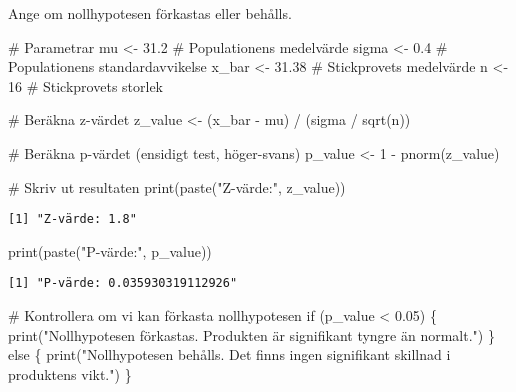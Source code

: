 \documentclass[
  letterpaper,
  DIV=11,
  numbers=noendperiod]{scrartcl}
\newenvironment{Shaded}{\begin{snugshade}}{\end{snugshade}}
\newcommand{\CommentTok}[1]{\textcolor[rgb]{0.37,0.37,0.37}{#1}}
\newcommand{\ControlFlowTok}[1]{\textcolor[rgb]{0.00,0.23,0.31}{#1}}
\newcommand{\DecValTok}[1]{\textcolor[rgb]{0.68,0.00,0.00}{#1}}
\newcommand{\FloatTok}[1]{\textcolor[rgb]{0.68,0.00,0.00}{#1}}
\newcommand{\FunctionTok}[1]{\textcolor[rgb]{0.28,0.35,0.67}{#1}}
\newcommand{\NormalTok}[1]{\textcolor[rgb]{0.00,0.23,0.31}{#1}}
\newcommand{\OtherTok}[1]{\textcolor[rgb]{0.00,0.23,0.31}{#1}}
\newcommand{\SpecialCharTok}[1]{\textcolor[rgb]{0.37,0.37,0.37}{#1}}
\newcommand{\StringTok}[1]{\textcolor[rgb]{0.13,0.47,0.30}{#1}}
\begin{document}
Ange om nollhypotesen förkastas eller behålls.

\begin{Shaded}
\begin{Highlighting}[]
\CommentTok{\# Parametrar}
\NormalTok{mu }\OtherTok{\textless{}{-}} \FloatTok{31.2}          \CommentTok{\# Populationens medelvärde}
\NormalTok{sigma }\OtherTok{\textless{}{-}} \FloatTok{0.4}        \CommentTok{\# Populationens standardavvikelse}
\NormalTok{x\_bar }\OtherTok{\textless{}{-}} \FloatTok{31.38}      \CommentTok{\# Stickprovets medelvärde}
\NormalTok{n }\OtherTok{\textless{}{-}} \DecValTok{16}             \CommentTok{\# Stickprovets storlek}

\CommentTok{\# Beräkna z{-}värdet}
\NormalTok{z\_value }\OtherTok{\textless{}{-}}\NormalTok{ (x\_bar }\SpecialCharTok{{-}}\NormalTok{ mu) }\SpecialCharTok{/}\NormalTok{ (sigma }\SpecialCharTok{/} \FunctionTok{sqrt}\NormalTok{(n))}

\CommentTok{\# Beräkna p{-}värdet (ensidigt test, höger{-}svans)}
\NormalTok{p\_value }\OtherTok{\textless{}{-}} \DecValTok{1} \SpecialCharTok{{-}} \FunctionTok{pnorm}\NormalTok{(z\_value)}

\CommentTok{\# Skriv ut resultaten}
\FunctionTok{print}\NormalTok{(}\FunctionTok{paste}\NormalTok{(}\StringTok{"Z{-}värde:"}\NormalTok{, z\_value))}
\end{Highlighting}
\end{Shaded}

\begin{verbatim}
[1] "Z-värde: 1.8"
\end{verbatim}

\begin{Shaded}
\begin{Highlighting}[]
\FunctionTok{print}\NormalTok{(}\FunctionTok{paste}\NormalTok{(}\StringTok{"P{-}värde:"}\NormalTok{, p\_value))}
\end{Highlighting}
\end{Shaded}

\begin{verbatim}
[1] "P-värde: 0.035930319112926"
\end{verbatim}

\begin{Shaded}
\begin{Highlighting}[]
\CommentTok{\# Kontrollera om vi kan förkasta nollhypotesen}
\ControlFlowTok{if}\NormalTok{ (p\_value }\SpecialCharTok{\textless{}} \FloatTok{0.05}\NormalTok{) \{}
  \FunctionTok{print}\NormalTok{(}\StringTok{"Nollhypotesen förkastas. Produkten är signifikant tyngre än normalt."}\NormalTok{)}
\NormalTok{\} }\ControlFlowTok{else}\NormalTok{ \{}
  \FunctionTok{print}\NormalTok{(}\StringTok{"Nollhypotesen behålls. Det finns ingen signifikant skillnad i produktens vikt."}\NormalTok{)}
\NormalTok{\}}
\end{Highlighting}
\end{Shaded}
\end{document}
